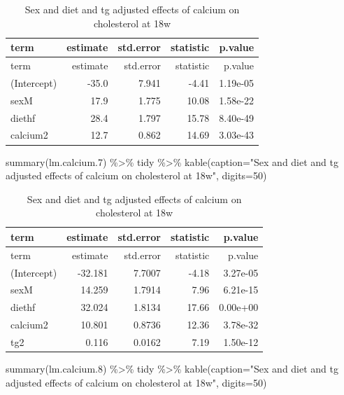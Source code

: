 \documentclass[
]{article}
\newenvironment{Shaded}{\begin{snugshade}}{\end{snugshade}}
\newcommand{\AttributeTok}[1]{\textcolor[rgb]{0.77,0.63,0.00}{#1}}
\newcommand{\DecValTok}[1]{\textcolor[rgb]{0.00,0.00,0.81}{#1}}
\newcommand{\FloatTok}[1]{\textcolor[rgb]{0.00,0.00,0.81}{#1}}
\newcommand{\FunctionTok}[1]{\textcolor[rgb]{0.00,0.00,0.00}{#1}}
\newcommand{\NormalTok}[1]{#1}
\newcommand{\SpecialCharTok}[1]{\textcolor[rgb]{0.00,0.00,0.00}{#1}}
\newcommand{\StringTok}[1]{\textcolor[rgb]{0.31,0.60,0.02}{#1}}
\begin{document}
\begin{longtable}[]{@{}lrrrr@{}}
\caption{Sex and diet and tg adjusted effects of calcium on cholesterol
at 18w}\tabularnewline
\toprule()
term & estimate & std.error & statistic & p.value \\
\midrule()
\endfirsthead
\toprule()
term & estimate & std.error & statistic & p.value \\
\midrule()
\endhead
(Intercept) & -35.0 & 7.941 & -4.41 & 1.19e-05 \\
sexM & 17.9 & 1.775 & 10.08 & 1.58e-22 \\
diethf & 28.4 & 1.797 & 15.78 & 8.40e-49 \\
calcium2 & 12.7 & 0.862 & 14.69 & 3.03e-43 \\
\bottomrule()
\end{longtable}

\begin{Shaded}
\begin{Highlighting}[]
\FunctionTok{summary}\NormalTok{(lm.calcium}\FloatTok{.7}\NormalTok{) }\SpecialCharTok{\%\textgreater{}\%}\NormalTok{ tidy }\SpecialCharTok{\%\textgreater{}\%} \FunctionTok{kable}\NormalTok{(}\AttributeTok{caption=}\StringTok{"Sex and diet and tg adjusted effects of calcium on cholesterol at 18w"}\NormalTok{, }\AttributeTok{digits=}\DecValTok{50}\NormalTok{)}
\end{Highlighting}
\end{Shaded}

\begin{longtable}[]{@{}lrrrr@{}}
\caption{Sex and diet and tg adjusted effects of calcium on cholesterol
at 18w}\tabularnewline
\toprule()
term & estimate & std.error & statistic & p.value \\
\midrule()
\endfirsthead
\toprule()
term & estimate & std.error & statistic & p.value \\
\midrule()
\endhead
(Intercept) & -32.181 & 7.7007 & -4.18 & 3.27e-05 \\
sexM & 14.259 & 1.7914 & 7.96 & 6.21e-15 \\
diethf & 32.024 & 1.8134 & 17.66 & 0.00e+00 \\
calcium2 & 10.801 & 0.8736 & 12.36 & 3.78e-32 \\
tg2 & 0.116 & 0.0162 & 7.19 & 1.50e-12 \\
\bottomrule()
\end{longtable}

\begin{Shaded}
\begin{Highlighting}[]
\FunctionTok{summary}\NormalTok{(lm.calcium}\FloatTok{.8}\NormalTok{) }\SpecialCharTok{\%\textgreater{}\%}\NormalTok{ tidy }\SpecialCharTok{\%\textgreater{}\%} \FunctionTok{kable}\NormalTok{(}\AttributeTok{caption=}\StringTok{"Sex and diet and tg adjusted effects of calcium on cholesterol at 18w"}\NormalTok{, }\AttributeTok{digits=}\DecValTok{50}\NormalTok{)}
\end{Highlighting}
\end{Shaded}
\end{document}
